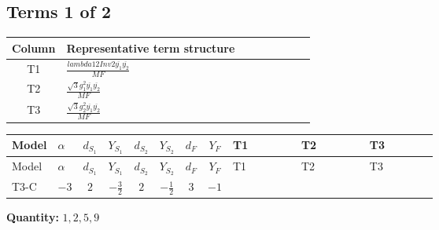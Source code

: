 \documentclass[8pt]{article}
\begin{document}
\begin{landscape}
\subsection*{Terms 1 of 2}
\begin{center}
\begin{tabular}{@{}c >{\raggedright\arraybackslash}p{0.82\linewidth}@{}}
\toprule
Column & Representative term structure \\
\midrule
T1 & \(\displaystyle \frac{lambda12Inv2 \overline{y_{1}} \overline{y_{2}}}{MF}\) \\
\midrule
T2 & \(\displaystyle \frac{\sqrt{3} g_{1}^{2} \overline{y_{1}} \overline{y_{2}}}{MF}\) \\
\midrule
T3 & \(\displaystyle \frac{\sqrt{3} g_{2}^{2} \overline{y_{1}} \overline{y_{2}}}{MF}\) \\
\midrule
\bottomrule
\end{tabular}
\end{center}
\smallskip
\tiny
\begin{longtable}{@{}llcccccc >{\raggedright\arraybackslash}p{0.21\linewidth} >{\raggedright\arraybackslash}p{0.21\linewidth} >{\raggedright\arraybackslash}p{0.21\linewidth}@{}}
\toprule
Model & $\alpha$ & $d_{S_1}$ & $Y_{S_1}$ & $d_{S_2}$ & $Y_{S_2}$ & $d_F$ & $Y_F$ & T1 & T2 & T3 \\
\midrule
\endfirsthead
\toprule
Model & $\alpha$ & $d_{S_1}$ & $Y_{S_1}$ & $d_{S_2}$ & $Y_{S_2}$ & $d_F$ & $Y_F$ & T1 & T2 & T3 \\
\midrule
\endhead
T3-C & $-3$ & $2$ & $-\frac{3}{2}$ & $2$ & $-\frac{1}{2}$ & $3$ & $-1$ & \scriptsize\adjustbox{max width=\linewidth}{$\begin{gathered} - \frac{lambda12Inv2 \overline{y_{1}} \overline{y_{2}}}{6 MF}\end{gathered}$} & \scriptsize\adjustbox{max width=\linewidth}{$\begin{gathered} - \frac{\sqrt{3} g_{1}^{2} \overline{y_{1}} \overline{y_{2}}}{4 MF}\end{gathered}$} & \scriptsize\adjustbox{max width=\linewidth}{$\begin{gathered} - \frac{\sqrt{3} g_{2}^{2} \overline{y_{1}} \overline{y_{2}}}{8 MF}\end{gathered}$} \\
\midrule
\bottomrule
\end{longtable}
\clearpage
\noindent\textbf{Quantity: }$\mathrm{1,2,5,9}$\par\smallskip

\end{landscape}
\end{document}
